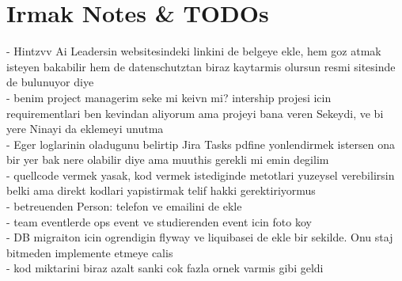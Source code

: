 \chapter{Irmak Notes \& TODOs}

- Hintzvv Ai Leadersin websitesindeki linkini de belgeye ekle, hem goz atmak isteyen bakabilir hem de datenschutztan biraz kaytarmis olursun resmi sitesinde de bulunuyor diye \\
- benim project managerim seke mi keivn mi? intership projesi icin requirementlari ben kevindan aliyorum ama projeyi bana veren Sekeydi, ve bi yere Ninayi da eklemeyi unutma \\
- Eger loglarinin oladugunu belirtip Jira Tasks pdfine yonlendirmek istersen ona bir yer bak nere olabilir diye ama muuthis gerekli mi emin degilim \\
- quellcode vermek yasak, kod vermek istediginde metotlari yuzeysel verebilirsin belki ama direkt kodlari yapistirmak telif hakki gerektiriyormus \\
- betreuenden Person: telefon ve emailini de ekle \\  
- team eventlerde ops event ve studierenden event icin foto koy \\
- DB migraiton icin ogrendigin flyway ve liquibasei de ekle bir sekilde. Onu staj bitmeden implemente etmeye calis \\
- kod miktarini biraz azalt sanki cok fazla ornek varmis gibi geldi